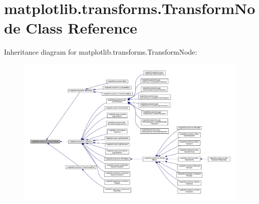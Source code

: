 \hypertarget{classmatplotlib_1_1transforms_1_1TransformNode}{}\section{matplotlib.\+transforms.\+Transform\+Node Class Reference}
\label{classmatplotlib_1_1transforms_1_1TransformNode}


Inheritance diagram for matplotlib.\+transforms.\+Transform\+Node\+:
\nopagebreak
\begin{figure}[H]
\begin{center}
\leavevmode
\includegraphics[width=350pt]{classmatplotlib_1_1transforms_1_1TransformNode__inherit__graph}
\end{center}
\end{figure}

